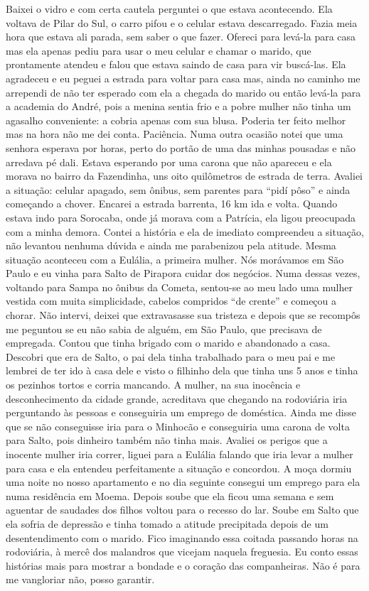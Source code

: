 \documentclass[12pt,brazil,]{book}
\begin{document}
Baixei o vidro e com certa cautela perguntei o que estava acontecendo.
Ela voltava de Pilar do Sul, o carro pifou e o celular estava
descarregado. Fazia meia hora que estava ali parada, sem saber o que
fazer. Ofereci para levá-la para casa mas ela apenas pediu para usar o
meu celular e chamar o marido, que prontamente atendeu e falou que
estava saindo de casa para vir buscá-las. Ela agradeceu e eu peguei a
estrada para voltar para casa mas, ainda no caminho me arrependi de não
ter esperado com ela a chegada do marido ou então levá-la para a
academia do André, pois a menina sentia frio e a pobre mulher não tinha
um agasalho conveniente: a cobria apenas com sua blusa. Poderia ter
feito melhor mas na hora não me dei conta. Paciência. Numa outra ocasião
notei que uma senhora esperava por horas, perto do portão de uma das
minhas pousadas e não arredava pé dali. Estava esperando por uma carona
que não apareceu e ela morava no bairro da Fazendinha, uns oito
quilômetros de estrada de terra. Avaliei a situação: celular apagado,
sem ônibus, sem parentes para ``pidí pôso'' e ainda começando a chover.
Encarei a estrada barrenta, 16 km ida e volta. Quando estava indo para
Sorocaba, onde já morava com a Patrícia, ela ligou preocupada com a
minha demora. Contei a história e ela de imediato compreendeu a
situação, não levantou nenhuma dúvida e ainda me parabenizou pela
atitude. Mesma situação aconteceu com a Eulália, a primeira mulher. Nós
morávamos em São Paulo e eu vinha para Salto de Pirapora cuidar dos
negócios. Numa dessas vezes, voltando para Sampa no ônibus da Cometa,
sentou-se ao meu lado uma mulher vestida com muita simplicidade, cabelos
compridos ``de crente'' e começou a chorar. Não intervi, deixei que
extravasasse sua tristeza e depois que se recompôs me peguntou se eu não
sabia de alguém, em São Paulo, que precisava de empregada. Contou que
tinha brigado com o marido e abandonado a casa. Descobri que era de
Salto, o pai dela tinha trabalhado para o meu pai e me lembrei de ter
ido à casa dele e visto o filhinho dela que tinha uns 5 anos e tinha os
pezinhos tortos e corria mancando. A mulher, na sua inocência e
desconhecimento da cidade grande, acreditava que chegando na rodoviária
iria perguntando às pessoas e conseguiria um emprego de doméstica. Ainda
me disse que se não conseguisse iria para o Minhocão e conseguiria uma
carona de volta para Salto, pois dinheiro também não tinha mais. Avaliei
os perigos que a inocente mulher iria correr, liguei para a Eulália
falando que iria levar a mulher para casa e ela entendeu perfeitamente a
situação e concordou. A moça dormiu uma noite no nosso apartamento e no
dia seguinte consegui um emprego para ela numa residência em Moema.
Depois soube que ela ficou uma semana e sem aguentar de saudades dos
filhos voltou para o recesso do lar. Soube em Salto que ela sofria de
depressão e tinha tomado a atitude precipitada depois de um
desentendimento com o marido. Fico imaginando essa coitada passando
horas na rodoviária, à mercê dos malandros que vicejam naquela
freguesia. Eu conto essas histórias mais para mostrar a bondade e o
coração das companheiras. Não é para me vangloriar não, posso garantir.
\end{document}
